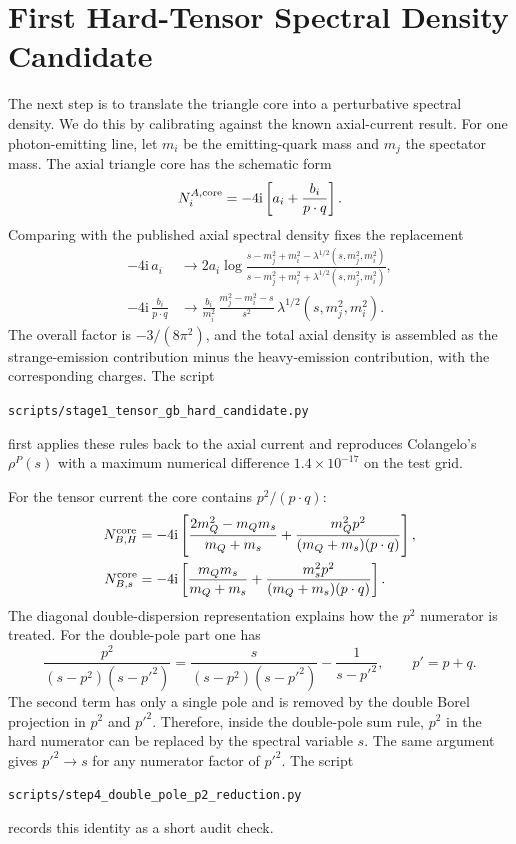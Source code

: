 \documentclass[11pt]{article}
\newcommand{\ii}{\mathrm{i}}
\begin{document}
\section{First Hard-Tensor Spectral Density Candidate}

The next step is to translate the triangle core into a perturbative spectral
density.  We do this by calibrating against the known axial-current result.
For one photon-emitting line, let $m_i$ be the emitting-quark mass and $m_j$ the
spectator mass.  The axial triangle core has the schematic form
\begin{equation}
  N_i^{A,\rm core}
  =
  -4\ii
  \left[
    a_i+\frac{b_i}{p\cdot q}
  \right].
\end{equation}
Comparing with the published axial spectral density fixes the replacement
\begin{align}
  -4\ii\,a_i
  &\longrightarrow
  2a_i
  \log\frac{s-m_j^2+m_i^2-\lambda^{1/2}(s,m_j^2,m_i^2)}
           {s-m_j^2+m_i^2+\lambda^{1/2}(s,m_j^2,m_i^2)},\\
  -4\ii\,\frac{b_i}{p\cdot q}
  &\longrightarrow
  \frac{b_i}{m_i^2}\,
  \frac{m_j^2-m_i^2-s}{s^2}\,
  \lambda^{1/2}(s,m_j^2,m_i^2).
\end{align}
The overall factor is $-3/(8\pi^2)$, and the total axial density is assembled
as the strange-emission contribution minus the heavy-emission contribution,
with the corresponding charges.  The script
\begin{center}
  \texttt{scripts/stage1\_tensor\_gb\_hard\_candidate.py}
\end{center}
first applies these rules back to the axial current and reproduces
Colangelo's $\rho^P(s)$ with a maximum numerical difference
$1.4\times10^{-17}$ on the test grid.

For the tensor current the core contains $p^2/(p\cdot q)$:
\begin{align}
  N_{B,H}^{\rm core}
  &=
  -4\ii
  \left[
    \frac{2m_Q^2-m_Qm_s}{m_Q+m_s}
    +
    \frac{m_Q^2p^2}{(m_Q+m_s)(p\cdot q)}
  \right],\\
  N_{B,s}^{\rm core}
  &=
  -4\ii
  \left[
    \frac{m_Qm_s}{m_Q+m_s}
    +
    \frac{m_s^2p^2}{(m_Q+m_s)(p\cdot q)}
  \right].
\end{align}
The diagonal double-dispersion representation explains how the $p^2$ numerator
is treated.  For the double-pole part one has
\begin{equation}
  \frac{p^2}{(s-p^2)(s-p'^2)}
  =
  \frac{s}{(s-p^2)(s-p'^2)}
  -
  \frac{1}{s-p'^2},
  \qquad p'=p+q .
\end{equation}
The second term has only a single pole and is removed by the double Borel
projection in $p^2$ and $p'^2$.  Therefore, inside the double-pole sum rule,
$p^2$ in the hard numerator can be replaced by the spectral variable $s$.  The
same argument gives $p'^2\to s$ for any numerator factor of $p'^2$.  The script
\begin{center}
  \texttt{scripts/step4\_double\_pole\_p2\_reduction.py}
\end{center}
records this identity as a short audit check.
\end{document}
